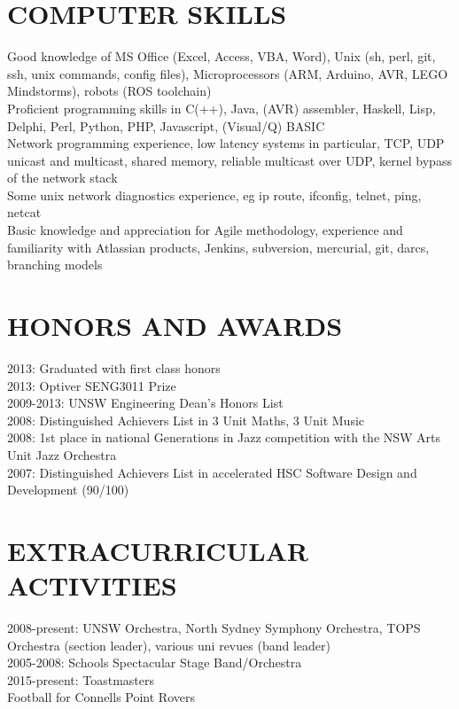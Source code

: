 \documentclass{res}
\begin{document}
\begin{resume}
\section{COMPUTER SKILLS}          
    Good knowledge of MS Office (Excel, Access, VBA, Word), Unix (sh, perl, git, ssh, unix commands, config files), Microprocessors (ARM, Arduino, AVR, LEGO Mindstorms), robots (ROS toolchain) \\
    Proficient programming skills in C(++), Java, (AVR) assembler, Haskell, Lisp, Delphi, Perl, Python, PHP, Javascript, (Visual/Q) BASIC \\
    Network programming experience, low latency systems in particular, TCP, UDP unicast and multicast, shared memory, reliable multicast over UDP, kernel bypass of the network stack \\
    Some unix network diagnostics experience, eg ip route, ifconfig, telnet, ping, netcat \\
    Basic knowledge and appreciation for Agile methodology, experience and familiarity with Atlassian products, Jenkins, subversion, mercurial, git, darcs, branching models
 
 
\section{HONORS AND AWARDS}          
    2013: Graduated with first class honors \\
    2013: Optiver SENG3011 Prize \\
    2009-2013: UNSW Engineering Dean's Honors List \\
    2008: Distinguished Achievers List in 3 Unit Maths, 3 Unit Music \\
    2008: 1st place in national Generations in Jazz competition with the NSW Arts Unit Jazz Orchestra \\
    2007: Distinguished Achievers List in accelerated HSC Software Design and Development (90/100)
 
\section{EXTRACURRICULAR ACTIVITIES}          
    2008-present: UNSW Orchestra, North Sydney Symphony Orchestra, TOPS Orchestra (section leader), various uni revues (band leader) \\
    2005-2008: Schools Spectacular Stage Band/Orchestra \\
    2015-present: Toastmasters \\
    Football for Connells Point Rovers
 
\end{resume}
\end{document}
